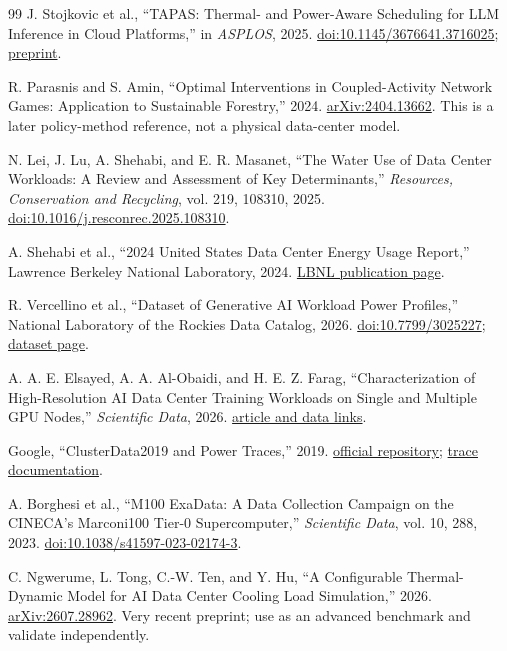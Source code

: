 \documentclass[10pt]{article}
\begin{document}
\begin{thebibliography}{99}
J. Stojkovic et al., ``TAPAS: Thermal- and Power-Aware Scheduling for LLM Inference in Cloud Platforms,'' in \emph{ASPLOS}, 2025. \href{https://doi.org/10.1145/3676641.3716025}{doi:10.1145/3676641.3716025}; \href{https://arxiv.org/abs/2501.02600}{preprint}.

R. Parasnis and S. Amin, ``Optimal Interventions in Coupled-Activity Network Games: Application to Sustainable Forestry,'' 2024. \href{https://arxiv.org/abs/2404.13662}{arXiv:2404.13662}. This is a later policy-method reference, not a physical data-center model.

N. Lei, J. Lu, A. Shehabi, and E. R. Masanet, ``The Water Use of Data Center Workloads: A Review and Assessment of Key Determinants,'' \emph{Resources, Conservation and Recycling}, vol. 219, 108310, 2025. \href{https://doi.org/10.1016/j.resconrec.2025.108310}{doi:10.1016/j.resconrec.2025.108310}.

A. Shehabi et al., ``2024 United States Data Center Energy Usage Report,'' Lawrence Berkeley National Laboratory, 2024. \href{https://eta-publications.lbl.gov/publications/2024-united-states-data-center-energy-usage-report}{LBNL publication page}.

R. Vercellino et al., ``Dataset of Generative AI Workload Power Profiles,'' National Laboratory of the Rockies Data Catalog, 2026. \href{https://doi.org/10.7799/3025227}{doi:10.7799/3025227}; \href{https://data.nlr.gov/submissions/312}{dataset page}.

A. A. E. Elsayed, A. A. Al-Obaidi, and H. E. Z. Farag, ``Characterization of High-Resolution AI Data Center Training Workloads on Single and Multiple GPU Nodes,'' \emph{Scientific Data}, 2026. \href{https://www.nature.com/articles/s41597-026-07496-6}{article and data links}.

Google, ``ClusterData2019 and Power Traces,'' 2019. \href{https://github.com/google/cluster-data}{official repository}; \href{https://github.com/google/cluster-data/blob/master/ClusterData2019.md}{trace documentation}.

A. Borghesi et al., ``M100 ExaData: A Data Collection Campaign on the CINECA's Marconi100 Tier-0 Supercomputer,'' \emph{Scientific Data}, vol. 10, 288, 2023. \href{https://doi.org/10.1038/s41597-023-02174-3}{doi:10.1038/s41597-023-02174-3}.

C. Ngwerume, L. Tong, C.-W. Ten, and Y. Hu, ``A Configurable Thermal-Dynamic Model for AI Data Center Cooling Load Simulation,'' 2026. \href{https://arxiv.org/abs/2607.28962}{arXiv:2607.28962}. Very recent preprint; use as an advanced benchmark and validate independently.


\end{thebibliography}
\end{document}

